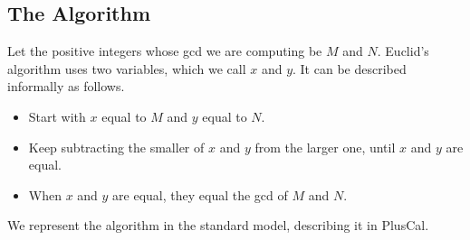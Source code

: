 % 
% 

\subsection{The Algorithm} \label{sec:euclid}


Let the positive integers whose gcd we are computing be $M$ and $N$.
Euclid's algorithm uses two variables, which we call $x$ and $y$.  It
can be described informally as follows.
\begin{itemize}
\item Start with $x$ equal to $M$ and $y$ equal to $N$.

\item Keep subtracting the smaller of $x$ and $y$ from the larger 
one, until $x$ and $y$ are equal.

\item When $x$ and $y$ are equal, they equal the gcd of $M$ and $N$.
\end{itemize}
We represent the algorithm in the standard model, describing it 
in PlusCal.

